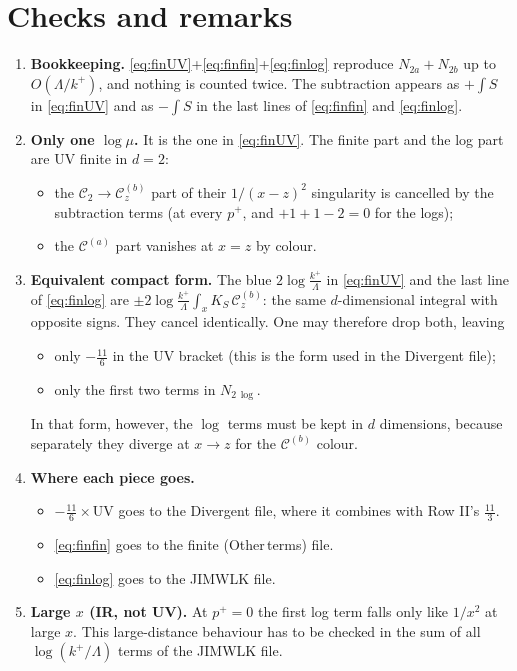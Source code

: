 \documentclass[10pt]{article}
\numberwithin{equation}{section}
\begin{document}
\section{Checks and remarks}
\begin{enumerate}
\item \textbf{Bookkeeping.} \eqref{eq:finUV}+\eqref{eq:finfin}+\eqref{eq:finlog} reproduce $N_{2a}+N_{2b}$ up to $O(\Lambda/k^{+})$, and nothing is counted twice. The subtraction appears as $+\int S$ in \eqref{eq:finUV} and as $-\int S$ in the last lines of \eqref{eq:finfin} and \eqref{eq:finlog}.
\item \textbf{Only one $\log\mu$.} It is the one in \eqref{eq:finUV}. The finite part and the log part are UV finite in $d=2$:
\begin{itemize}
\item the $\mathcal{C}_{2}\to\mathcal{C}^{(b)}_{z}$ part of their $1/(x-z)^{2}$ singularity is cancelled by the subtraction terms (at every $p^{+}$, and $+1+1-2=0$ for the logs);
\item the $\mathcal{C}^{(a)}$ part vanishes at $x=z$ by colour.
\end{itemize}
\item \textbf{Equivalent compact form.} The blue $2\log\frac{k^{+}}{\Lambda}$ in \eqref{eq:finUV} and the last line of \eqref{eq:finlog} are $\pm2\log\frac{k^{+}}{\Lambda}\int_{x}K_{S}\,\mathcal{C}^{(b)}_{z}$: the same $d$-dimensional integral with opposite signs. They cancel identically. One may therefore drop both, leaving
\begin{itemize}
\item only $-\frac{11}{6}$ in the UV bracket (this is the form used in the Divergent file);
\item only the first two terms in $N_{2\,\log}$.
\end{itemize}
In that form, however, the $\log$ terms must be kept in $d$ dimensions, because separately they diverge at $x\to z$ for the $\mathcal{C}^{(b)}$ colour.
\item \textbf{Where each piece goes.}
\begin{itemize}
\item $-\frac{11}{6}\times$UV goes to the Divergent file, where it combines with Row II's $\frac{11}{3}$.
\item \eqref{eq:finfin} goes to the finite (Other\,terms) file.
\item \eqref{eq:finlog} goes to the JIMWLK file.
\end{itemize}
\item \textbf{Large $x$ (IR, not UV).} At $p^{+}=0$ the first log term falls only like $1/x^{2}$ at large $x$. This large-distance behaviour has to be checked in the sum of all $\log(k^{+}/\Lambda)$ terms of the JIMWLK file.
\end{enumerate}
\end{document}

